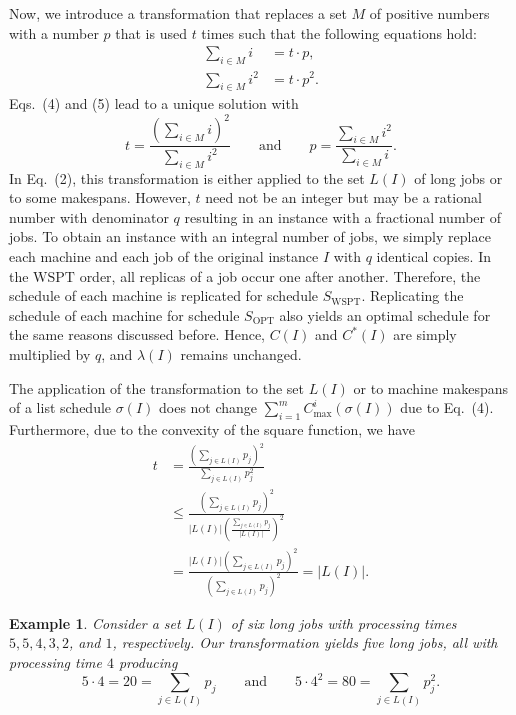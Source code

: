 \documentclass[11pt]{article}
\newtheorem{example}{Example}
\newcommand{\WSPT}{\mathrm{WSPT}}
\newcommand{\OPT}{\mathrm{OPT}}
\begin{document}
Now, we introduce a transformation that replaces a set $M$ of positive
numbers with a number $p$ that is used $t$ times such that the following
equations hold:
\begin{align}
        \sum_{i\in M} i &= t\cdot p, \\
        \sum_{i\in M} i^2 &= t\cdot p^2 .
\end{align}
Eqs.~(4) and (5) lead to a unique solution with
\[
        t=\frac{\left(\sum_{i\in M}i\right)^2}{\sum_{i\in M}i^2}
        \qquad\text{and}\qquad
        p=\frac{\sum_{i\in M}i^2}{\sum_{i\in M}i}.
\]
In Eq.~(2), this transformation is either applied to the set $L(I)$ of long
jobs or to some makespans. However, $t$ need not be an integer but may be a
rational number with denominator $q$ resulting in an instance with a
fractional number of jobs. To obtain an instance with an integral number of
jobs, we simply replace each machine and each job of the original instance
$I$ with $q$ identical copies. In the \(\mathrm{WSPT}\) order, all replicas of a job occur
one after another. Therefore, the schedule of each machine is replicated for
schedule $S_{\WSPT}$. Replicating the schedule of each machine for schedule
$S_{\OPT}$ also yields an optimal schedule for the same reasons discussed
before. Hence, $C(I)$ and $C^*(I)$ are simply multiplied by $q$, and
$\lambda(I)$ remains unchanged.

The application of the transformation to the set $L(I)$ or to machine
makespans of a list schedule $\sigma(I)$ does not change
$\sum_{i=1}^m C_{\max}^i(\sigma(I))$ due to Eq.~(4). Furthermore, due to the
convexity of the square function, we have
\begin{equation}
\begin{aligned}
        t
        &=
        \frac{\left(\sum_{j\in L(I)}p_j\right)^2}
        {\sum_{j\in L(I)}p_j^2}                                      \\
        &\leq
        \frac{\left(\sum_{j\in L(I)}p_j\right)^2}
        {|L(I)|\left(\frac{\sum_{j\in L(I)}p_j}{|L(I)|}\right)^2}       \\
        &=
        \frac{|L(I)|\left(\sum_{j\in L(I)}p_j\right)^2}
        {\left(\sum_{j\in L(I)}p_j\right)^2}
        =
        |L(I)|.
\end{aligned}
\end{equation}

\begin{example}
Consider a set $L(I)$ of six long jobs with processing times $5,5,4,3,2$,
and $1$, respectively. Our transformation yields five long jobs, all with
processing time $4$ producing
\[
        5\cdot 4=20=\sum_{j\in L(I)}p_j
        \qquad\text{and}\qquad
        5\cdot 4^2=80=\sum_{j\in L(I)}p_j^2 .
\]
\end{example}
\end{document}
